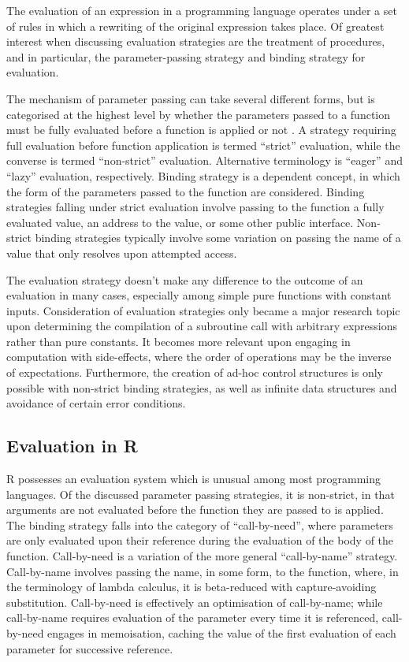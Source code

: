 The evaluation of an expression in a programming language operates under a set of rules in which a rewriting of the original expression takes place.
Of greatest interest when discussing evaluation strategies are the treatment of procedures, and in particular, the parameter-passing strategy and binding strategy for evaluation.

The mechanism of parameter passing can take several different forms, but is categorised at the highest level by whether the parameters passed to a function must be fully evaluated before a function is applied or not \cite{crank1991param}.
A strategy requiring full evaluation before function application is termed ``strict'' evaluation, while the converse is termed ``non-strict'' evaluation.
Alternative terminology is ``eager'' and ``lazy'' evaluation, respectively\cite{henderson1976lazy}.
Binding strategy is a dependent concept, in which the form of the parameters passed to the function are considered\cite{abelson1996sicp:order}.
Binding strategies falling under strict evaluation involve passing to the function a fully evaluated value, an address to the value, or some other public interface.
Non-strict binding strategies typically involve some variation on passing the name of a value that only resolves upon attempted access.

The evaluation strategy doesn't make any difference to the outcome of an evaluation in many cases, especially among simple pure functions with constant inputs.
Consideration of evaluation strategies only became a major research topic upon determining the compilation of a subroutine call with arbitrary expressions rather than pure constants.
It becomes more relevant upon engaging in computation with side-effects, where the order of operations may be the inverse of expectations.
Furthermore, the creation of ad-hoc control structures is only possible with non-strict binding strategies, as well as infinite data structures and avoidance of certain error conditions\cite{okasaki1998functional}.

\subsection{Evaluation in R}\label{sec:evalinr}

R possesses an evaluation system which is unusual among most programming languages.
Of the discussed parameter passing strategies, it is non-strict, in that arguments are not evaluated before the function they are passed to is applied\cite{rcore2020ints:argeval}.
The binding strategy falls into the category of ``call-by-need'', where parameters are only evaluated upon their reference during the evaluation of the body of the function\cite{ariola1995callbyneed}.
Call-by-need is a variation of the more general ``call-by-name'' strategy.
Call-by-name involves passing the name, in some form, to the function, where, in the terminology of lambda calculus, it is beta-reduced with capture-avoiding substitution\cite{fischer1972lambda}.
Call-by-need is effectively an optimisation of call-by-name; while call-by-name requires evaluation of the parameter every time it is referenced, call-by-need engages in memoisation, caching the value of the first evaluation of each parameter for successive reference.


